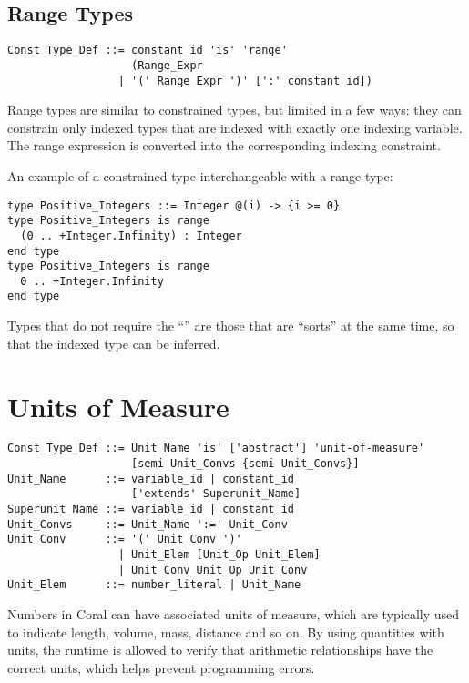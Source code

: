\subsection{Range Types}
\label{sec:range-types}

\syntax\begin{lstlisting}
Const_Type_Def ::= constant_id 'is' 'range' 
                   (Range_Expr 
                 | '(' Range_Expr ')' [':' constant_id])
\end{lstlisting}

Range types are similar to constrained types, but limited in a few ways: they can constrain only indexed types that are indexed with exactly one indexing variable. The range expression is converted into the corresponding indexing constraint. 

\example An example of a constrained type interchangeable with a range type:
\begin{lstlisting}
type Positive_Integers ::= Integer @(i) -> {i >= 0}
type Positive_Integers is range 
  (0 .. +Integer.Infinity) : Integer 
end type
type Positive_Integers is range
  0 .. +Integer.Infinity
end type
\end{lstlisting}

Types that do not require the ``'' are those that are ``sorts'' at the same time, so that the indexed type can be inferred. 






\section{Units of Measure}
\label{sec:units-of-measure}

\syntax\begin{lstlisting}
Const_Type_Def ::= Unit_Name 'is' ['abstract'] 'unit-of-measure' 
                   [semi Unit_Convs {semi Unit_Convs}]
Unit_Name      ::= variable_id | constant_id
                   ['extends' Superunit_Name]
Superunit_Name ::= variable_id | constant_id
Unit_Convs     ::= Unit_Name ':=' Unit_Conv
Unit_Conv      ::= '(' Unit_Conv ')'
                 | Unit_Elem [Unit_Op Unit_Elem]
                 | Unit_Conv Unit_Op Unit_Conv
Unit_Elem      ::= number_literal | Unit_Name
\end{lstlisting}

Numbers in Coral can have associated units of measure, which are typically used to indicate length, volume, mass, distance and so on. By using quantities with units, the runtime is allowed to verify that arithmetic relationships have the correct units, which helps prevent programming errors. 

